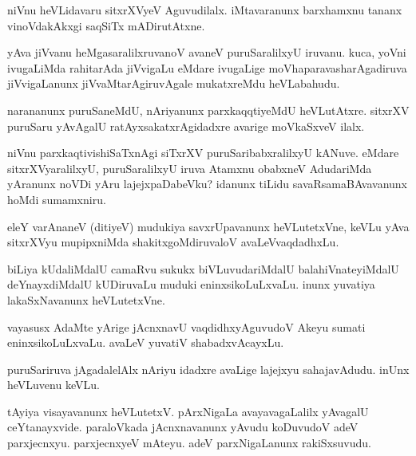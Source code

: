 \documentclass{article}
\begin{document}
\begin{mn}
niVnu heVLidavaru sitxrXVyeV Aguvudilalx. iMtavaranunx barxhamxnu tananx
vinoVdakAkxgi saqSiTx mADirutAtxne.
\end{mn}

\begin{mn}
yAva jiVvanu heMgasaralilxruvanoV avaneV puruSaralilxyU iruvanu. kuca, yoVni 
ivugaLiMda rahitarAda jiVvigaLu eMdare ivugaLige moVhaparavasharAgadiruva
jiVvigaLanunx jiVvaMtarAgiruvAgale mukatxreMdu heVLabahudu.
\end{mn}

\begin{mn}
narananunx puruSaneMdU, nAriyanunx parxkaqqtiyeMdU heVLutAtxre. sitxrXV 
puruSaru yAvAgalU  ratAyxsakatxrAgidadxre avarige moVkaSxveV ilalx.
\end{mn}

\begin{mn}
niVnu parxkaqtivishiSaTxnAgi siTxrXV puruSaribabxralilxyU kANuve. eMdare 
sitxrXVyaralilxyU, puruSaralilxyU iruva Atamxnu  obabxneV AdudariMda yAranunx 
noVDi yAru lajejxpaDabeVku? idanunx tiLidu savaRsamaBAvavanunx hoMdi sumamxniru. 
\end{mn}

\begin{mn}eleY varAnaneV (ditiyeV) mudukiya savxrUpavanunx heVLutetxVne, 
keVLu yAva sitxrXVyu mupipxniMda shakitxgoMdiruvaloV avaLeVvaqdadhxLu. 
\end{mn}

\begin{mn}
biLiya kUdaliMdalU camaRvu sukukx biVLuvudariMdalU balahiVnateyiMdalU 
 deYnayxdiMdalU kUDiruvaLu muduki eninxsikoLuLxvaLu.  inunx yuvatiya 
 lakaSxNavanunx heVLutetxVne. 
\end{mn}

\begin{mn}
vayasusx AdaMte yArige jAcnxnavU vaqdidhxyAguvudoV Akeyu sumati eninxsikoLuLxvaLu.
avaLeV yuvatiV shabadxvAcayxLu.
\end{mn}

\begin{mn}
puruSariruva jAgadalelAlx nAriyu idadxre avaLige lajejxyu sahajavAdudu. 
inUnx heVLuvenu keVLu.
\end{mn}

\begin{mn}
tAyiya visayavanunx heVLutetxV. pArxNigaLa avayavagaLalilx yAvagalU ceYtanayxvide.
 paraloVkada jAcnxnavanunx yAvudu koDuvudoV adeV parxjecnxyu.  parxjecnxyeV 
 mAteyu. adeV parxNigaLanunx rakiSxsuvudu. 
\end{mn}
\end{document}
